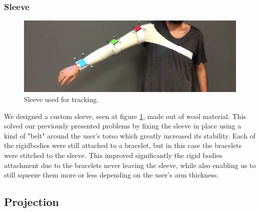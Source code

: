 \subsubsection{Sleeve}

\begin{figure}[!t]
    \begin{center}
        \includegraphics[width=\textwidth]{imgs/sleevewearable.png}
    \end{center}
    \caption{Sleeve used for tracking.}
    \label{fig:sleevewearable}
\end{figure}

We designed a custom sleeve, seen at figure \ref{fig:sleevewearable}, made out of wool material. This solved our previously presented problems by fixing the sleeve in place using a kind of "belt" around the user's torso which greatly increased its stability. Each of the rigidbodies were still attached to a bracelet, but in this case the bracelets were stitched to the sleeve. This improved significantly the rigid bodies attachment due to the bracelets never leaving the sleeve, while also enabling us to still squeeze them more or less depending on the user's arm thickness.


\subsection{Projection}
\label{prototype-projection}

